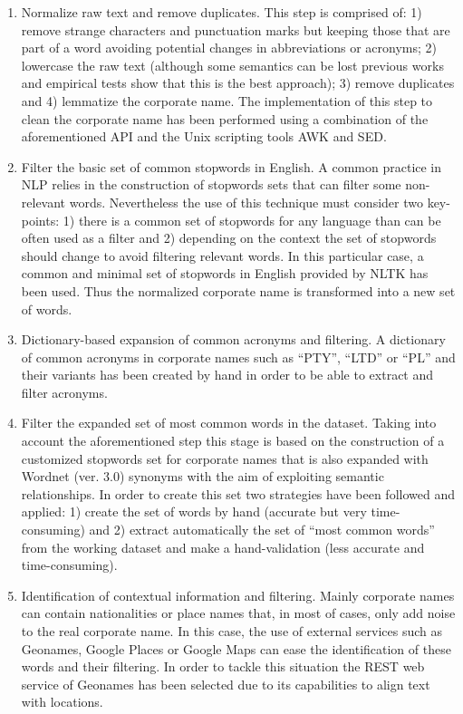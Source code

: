 \documentclass{llncs}
\begin{document}
\begin{enumerate}
 \item Normalize raw text and remove duplicates. This step is comprised of: 1) remove strange characters and punctuation marks but keeping 
 those that are part of a word avoiding potential changes in  abbreviations or acronyms; 2) lowercase the raw text (although some semantics can 
 be lost previous works and empirical tests show that this is the best approach); 3) remove duplicates and 4) lemmatize the corporate name. 
 The implementation of this step to clean the corporate name has been performed using a combination of the aforementioned API and 
 the Unix scripting tools AWK and SED. 

\item Filter the basic set of common stopwords in English. A common practice in NLP relies in the construction 
of stopwords sets that can filter some non-relevant words. Nevertheless the use of this technique must 
consider two key-points: 1) there is a common set of stopwords for any language than can be often used as a filter and 
2) depending on the context the set of stopwords should change to avoid filtering relevant words. In this particular 
case, a common and minimal set of stopwords in English provided by NLTK has been used. Thus the normalized corporate name is 
transformed into a new set of words. 

\item Dictionary-based expansion of common acronyms and filtering. A dictionary of common acronyms in corporate 
names such as ``PTY'', ``LTD'' or ``PL'' and their variants has been created by hand in order 
to be able to extract and filter acronyms. 


\item Filter the expanded set of most common words in the dataset. Taking into account 
the aforementioned step this stage is based on the construction of a customized stopwords 
set for corporate names that is also expanded with Wordnet (ver. 3.0) synonyms with the aim of 
exploiting semantic relationships. In order to create this set two strategies have been followed and applied: 1) create the set 
of words by hand (accurate but very time-consuming) and 2) extract automatically the set of ``most common words'' from the 
working dataset and make a hand-validation (less accurate and time-consuming). 


\item Identification of contextual information and filtering. Mainly corporate names can contain nationalities or place names that, in most of 
cases, only add noise to the real corporate name. In this case, the use of external services such as Geonames, Google Places 
or Google Maps can ease the identification of these words and their filtering. In order to tackle this situation the REST web service 
of Geonames has been selected due to its capabilities to align text with locations.


\end{enumerate}
\end{document}

